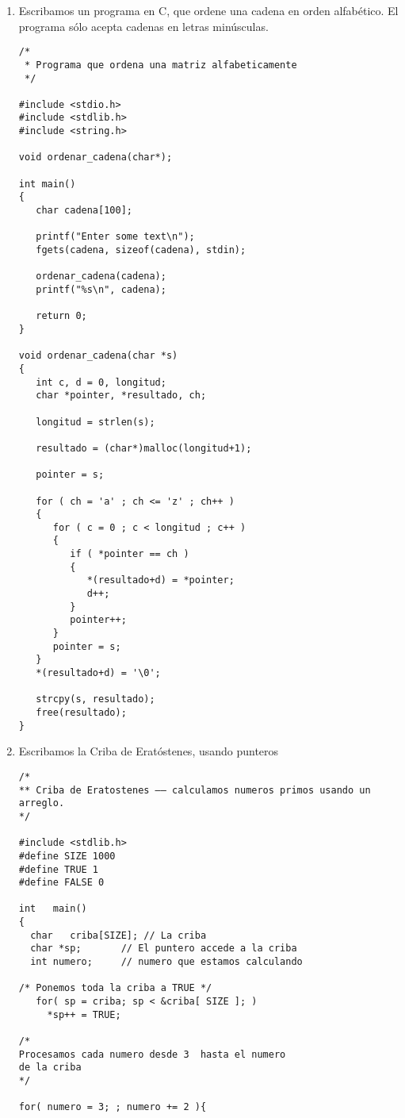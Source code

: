 \documentclass[twoside,10.5pt]{article}%
\begin{document}
\begin{enumerate}
\item Escribamos un programa en C, que ordene una cadena en orden alfab\'etico. El programa s\'olo acepta cadenas en letras min\'usculas.

\begin{verbatim}
/*
 * Programa que ordena una matriz alfabeticamente 
 */

#include <stdio.h>
#include <stdlib.h>
#include <string.h>
 
void ordenar_cadena(char*);
 
int main()
{
   char cadena[100];
 
   printf("Enter some text\n");
   fgets(cadena, sizeof(cadena), stdin);
 
   ordenar_cadena(cadena);
   printf("%s\n", cadena);
 
   return 0;
}
 
void ordenar_cadena(char *s)
{
   int c, d = 0, longitud;
   char *pointer, *resultado, ch;
 
   longitud = strlen(s);
 
   resultado = (char*)malloc(longitud+1);
 
   pointer = s;
 
   for ( ch = 'a' ; ch <= 'z' ; ch++ )
   {
      for ( c = 0 ; c < longitud ; c++ )
      {
         if ( *pointer == ch )
         {
            *(resultado+d) = *pointer;
            d++;
         }
         pointer++;
      }
      pointer = s;
   }
   *(resultado+d) = '\0';
 
   strcpy(s, resultado);
   free(resultado);
}
\end{verbatim}


\item Escribamos la Criba de Erat\'ostenes, usando punteros

\begin{verbatim}
/*
** Criba de Eratostenes –– calculamos numeros primos usando un arreglo.
*/

#include <stdlib.h>
#define SIZE 1000
#define TRUE 1
#define FALSE 0

int   main()
{
  char   criba[SIZE]; // La criba
  char *sp;       // El puntero accede a la criba
  int numero;     // numero que estamos calculando
 
/* Ponemos toda la criba a TRUE */
   for( sp = criba; sp < &criba[ SIZE ]; )
     *sp++ = TRUE;

/*
Procesamos cada numero desde 3  hasta el numero 
de la criba 
*/
   
for( numero = 3; ; numero += 2 ){


\end{verbatim}
\end{enumerate}
\end{document}
